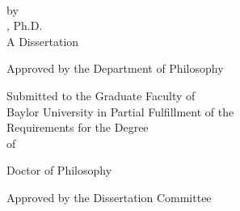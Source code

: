 \documentclass[12pt]{report}
\begin{document}
\thispagestyle{empty}
\begin{center}
    \begin{singlespacing}
    \mytitle{}\\            %
    \end{singlespacing}

    by\\
    
    \myname{}, Ph.D.\\ %

    A Dissertation
    
    Approved by the Department of Philosophy
    

\begin{singlespacing}
    Submitted to the Graduate Faculty of\\
    
    Baylor University in Partial Fulfillment of the\\
    
    Requirements for the Degree\\
    
    of\\
    
\end{singlespacing}

    Doctor of Philosophy\\ %
\end{center}

\vspace{0.25in} %

\begin{minipage}{3.625in}
\begin{center}
Approved by the Dissertation Committee


\vspace{-.175in}


\vspace{-.175in}


\vspace{-.175in}


\vspace{-.175in}

{\color{white} } %
\end{center}
\end{minipage}
\end{document}
